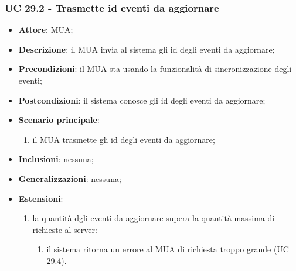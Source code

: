     \subsubsection{UC 29.2 - Trasmette id eventi da aggiornare} \label{sec:UC29.2}
    \begin{itemize}
        \item \textbf{Attore}: MUA;
        \item \textbf{Descrizione}: il MUA invia al sistema gli id degli eventi da aggiornare;
        \item \textbf{Precondizioni}: il MUA sta usando la funzionalità di sincronizzazione degli eventi;
        \item \textbf{Postcondizioni}: il sistema conosce gli id degli eventi da aggiornare;
        \item \textbf{Scenario principale}:
            \begin{enumerate}
                \item il MUA trasmette gli id degli eventi da aggiornare;
            \end{enumerate}
        \item \textbf{Inclusioni}: nessuna;
        \item \textbf{Generalizzazioni}: nessuna;
        \item \textbf{Estensioni}:
            \begin{enumerate}[label=\alph*.]
                \item la quantità dgli eventi da aggiornare supera la quantità massima di richieste al server:
                \begin{enumerate}[label=\arabic*.]
                    \item il sistema ritorna un errore al MUA di richiesta troppo grande (\hyperref[sec:UC29.4]{UC 29.4}).
                \end{enumerate}
            \end{enumerate}
    \end{itemize}



